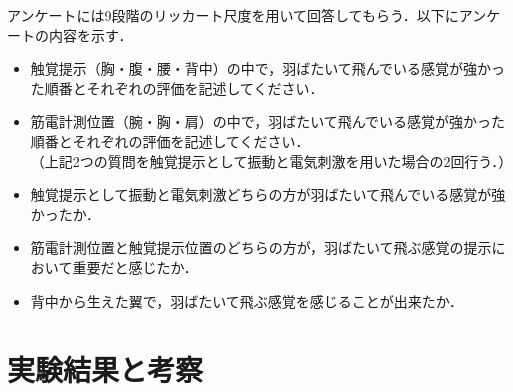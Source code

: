         アンケートには9段階のリッカート尺度\cite{lickert1932method}を用いて回答してもらう．以下にアンケートの内容を示す．
        \begin{itemize}
        \item 触覚提示（胸・腹・腰・背中）の中で，羽ばたいて飛んでいる感覚が強かった順番とそれぞれの評価を記述してください．
        \item 筋電計測位置（腕・胸・肩）の中で，羽ばたいて飛んでいる感覚が強かった順番とそれぞれの評価を記述してください．\\
        （上記2つの質問を触覚提示として振動と電気刺激を用いた場合の2回行う．）
        \item  触覚提示として振動と電気刺激どちらの方が羽ばたいて飛んでいる感覚が強かったか．
        \item 筋電計測位置と触覚提示位置のどちらの方が，羽ばたいて飛ぶ感覚の提示において重要だと感じたか．
        \item 背中から生えた翼で，羽ばたいて飛ぶ感覚を感じることが出来たか．
        \end{itemize}


\section{実験結果と考察}






